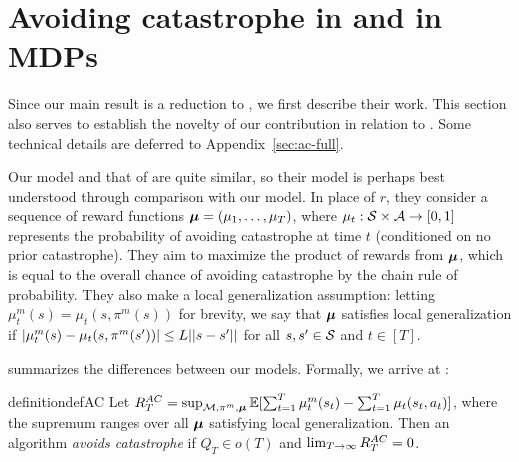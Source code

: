 

\section{Avoiding catastrophe in \citet{plaut_avoiding_2024} and in MDPs}\label{sec:ac-overview}

Since our main result is a reduction to \citet{plaut_avoiding_2024}, we first describe their work. This section also serves to establish the novelty of our contribution in relation to \citet{plaut_avoiding_2024}. Some technical details are deferred to Appendix~\ref{sec:ac-full}.

Our model and that of \citet{plaut_avoiding_2024} are quite similar, so their model is perhaps best understood through comparison with our model. In place of $r$, they consider a sequence of reward functions $\boldsymbol{\mu} = (\mu_1,\dots,\mu_T)$, where $\mu_t: \mathcal{S}\times\mathcal{A}\to[0,1]$ represents the probability of avoiding catastrophe at time $t$ (conditioned on no prior catastrophe). They aim to maximize the product of rewards from $\boldsymbol{\mu}$, which is equal to the overall chance of avoiding catastrophe by the chain rule of probability. They also make a local generalization assumption: letting $\mu_t^m(s) = \mu_t(s, \pi^m(s))$ for brevity, we say that $\boldsymbol{\mu}$ satisfies local generalization if $|\mu_t^m(s) - \mu_t(s, \pi^m(s'))| \le L||s - s'||$ for all $s, s'\in \mathcal{S}$ and $t \in [T]$.






 summarizes the differences between our models. Formally, we arrive at :

\begin{restatable}{definition}{defAC}
\label{def:ac}
Let $R_T^{AC} = \sup_{\mathcal{M}, \pi^m,\boldsymbol{\mu}} \operatorname*{\mathbb{E}}[\sum_{t=1}^T \mu_t^m(s_t) - \sum_{t=1}^T \mu_t(s_t, a_t)]$, where the supremum ranges over all $\boldsymbol{\mu}$ satisfying local generalization. Then an algorithm \emph{avoids catastrophe} if $Q_T \in o(T)$ and $\lim_{T\to\infty} R_T^{AC} = 0$.
\end{restatable}

